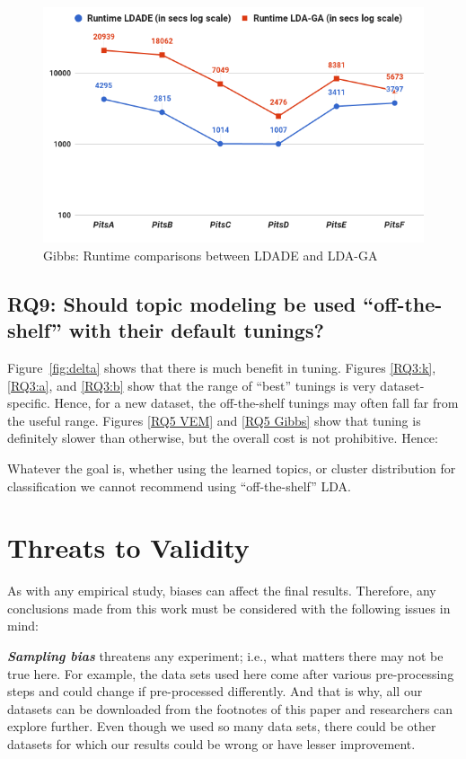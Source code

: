\documentclass[twocolumn,5p,sort&compress]{elsarticle}
\theoremstyle{break}
\begin{document}
\begin{figure}[!htbp]
  \includegraphics[width=\linewidth]{./fig/runtime_ga.png}
  \caption{Gibbs: Runtime comparisons between LDADE and LDA-GA}
  \label{fig:run_ldaga}
\end{figure}

\subsection{\textbf{RQ9: Should topic modeling be used ``off-the-shelf'' with their default tunings?}}

  Figure~\ref{fig:delta} shows that there is much benefit in tuning.
  Figures \ref{RQ3:k}, \ref{RQ3:a}, and \ref{RQ3:b} show that
  the range of ``best'' tunings is very dataset-specific. Hence, for a new dataset,
  the off-the-shelf tunings
  may often fall far from the useful range.
  Figures \ref{RQ5 VEM} and \ref{RQ5 Gibbs} show that tuning is definitely
  slower than otherwise, but the overall cost is not prohibitive.
  Hence:
  \begin{lesson}
    Whatever the goal is, whether using the learned topics, or cluster distribution for classification
    we cannot recommend using ``off-the-shelf'' LDA.
  \end{lesson}


\section{Threats to Validity}
\label{sect:validity}

As with any empirical study, biases can affect the final
results. Therefore, any conclusions made from this work must be considered with the following issues in mind:

\textbf{\textit{Sampling bias}} threatens any experiment; i.e., what matters there may not be true here. For example,
the data sets used here come after various pre-processing steps and could change if pre-processed differently. And that is why, all our datasets can be downloaded from the footnotes of this paper and researchers can explore further. Even though we used so many data sets, there could be other datasets for which our results could be wrong or have lesser improvement.
\end{document}
